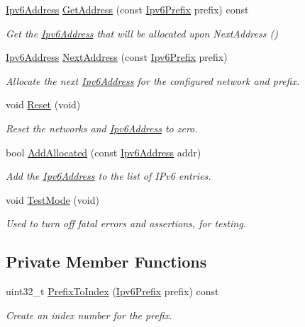 \begin{DoxyCompactItemize}
\hyperlink{classns3_1_1Ipv6Address}{Ipv6\+Address} \hyperlink{classns3_1_1Ipv6AddressGeneratorImpl_aa8800dbe56d09cfb4ce1b113d3fac05b}{Get\+Address} (const \hyperlink{classns3_1_1Ipv6Prefix}{Ipv6\+Prefix} prefix) const 
\begin{DoxyCompactList}\small\item\em Get the \hyperlink{classns3_1_1Ipv6Address}{Ipv6\+Address} that will be allocated upon Next\+Address () \end{DoxyCompactList}\item 
\hyperlink{classns3_1_1Ipv6Address}{Ipv6\+Address} \hyperlink{classns3_1_1Ipv6AddressGeneratorImpl_afb2185b91099b54261f6da28db9fa7af}{Next\+Address} (const \hyperlink{classns3_1_1Ipv6Prefix}{Ipv6\+Prefix} prefix)
\begin{DoxyCompactList}\small\item\em Allocate the next \hyperlink{classns3_1_1Ipv6Address}{Ipv6\+Address} for the configured network and prefix. \end{DoxyCompactList}\item 
void \hyperlink{classns3_1_1Ipv6AddressGeneratorImpl_a354d201c23d26fa688f5304f44a1b780}{Reset} (void)
\begin{DoxyCompactList}\small\item\em Reset the networks and \hyperlink{classns3_1_1Ipv6Address}{Ipv6\+Address} to zero. \end{DoxyCompactList}\item 
bool \hyperlink{classns3_1_1Ipv6AddressGeneratorImpl_a66afcc32c159fb8d9b227a22ef9878d5}{Add\+Allocated} (const \hyperlink{classns3_1_1Ipv6Address}{Ipv6\+Address} addr)
\begin{DoxyCompactList}\small\item\em Add the \hyperlink{classns3_1_1Ipv6Address}{Ipv6\+Address} to the list of I\+Pv6 entries. \end{DoxyCompactList}\item 
void \hyperlink{classns3_1_1Ipv6AddressGeneratorImpl_a88df25c8dd71ea69fb699ab032aa4ddf}{Test\+Mode} (void)
\begin{DoxyCompactList}\small\item\em Used to turn off fatal errors and assertions, for testing. \end{DoxyCompactList}\end{DoxyCompactItemize}
\subsection*{Private Member Functions}
\begin{DoxyCompactItemize}
\item 
uint32\+\_\+t \hyperlink{classns3_1_1Ipv6AddressGeneratorImpl_a0dbdd6e1547463c189a0e82251557e44}{Prefix\+To\+Index} (\hyperlink{classns3_1_1Ipv6Prefix}{Ipv6\+Prefix} prefix) const 
\begin{DoxyCompactList}\small\item\em Create an index number for the prefix. \end{DoxyCompactList}\end{DoxyCompactItemize}
